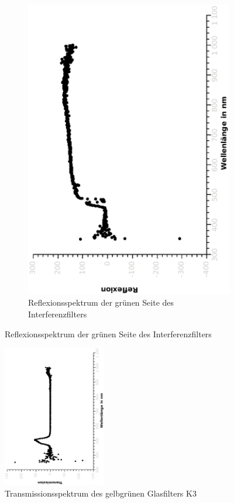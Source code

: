 \documentclass{article}
\begin{document}
\begin{figure}[H]
\begin{subfigure}[h]{0.4\textwidth}
\includegraphics[width=\textwidth ,angle=-90]{eps/interreflgruen.eps}
\caption{Reflexionsspektrum der grünen Seite des Interferenzfilters}
\end{subfigure}
\end{figure}

\begin{figure}
\centering
\includegraphics[width=0.4\textwidth, angle=-90]{eps/glasfilterk3.eps}
\caption{Transmissionsspektrum des gelbgrünen Glasfilters K3}
\end{figure}
\end{document}
